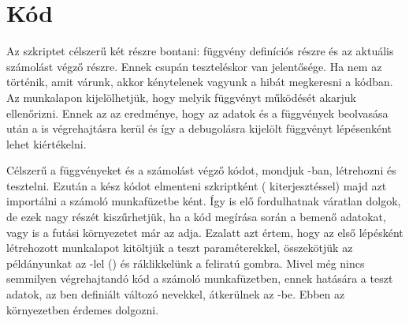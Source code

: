 \section{Kód}
\label{sec:2.2} %
Az  szkriptet célszerű két részre bontani: függvény definíciós
részre és az aktuális számolást 
végző részre. Ennek csupán teszteléskor van jelentősége. Ha nem az
történik, amit várunk, 
akkor kénytelenek vagyunk a hibát megkeresni a kódban. Az 
munkalapon kijelölhetjük, hogy melyik függvényt működését akarjuk
ellenőrizni. Ennek az az eredménye, hogy az 
adatok és a függvények beolvasása után a  is
végrehajtásra kerül és így 
a debugolásra kijelölt függvényt lépésenként lehet kiértékelni.

Célszerű a függvényeket és a számolást végző kódot, mondjuk -ban, létrehozni
és tesztelni. Ezután a kész kódot elmenteni  szkriptként (
kiterjesztéssel) majd azt importálni a számoló munkafüzetbe ként. Így is elő fordulhatnak váratlan dolgok, de 
ezek nagy részét kiszűrhetjük, ha a kód megírása során a bemenő
adatokat, vagy is a futási 
környezetet már az  adja. Ezalatt azt értem, hogy az első
lépésként létrehozott  
munkalapot kitöltjük a teszt paraméterekkel, összekötjük az 
példányunkat az -lel 
() és ráklikkelünk a
 feliratú gombra. Mivel még nincs semmilyen
végrehajtandó kód a számoló munkafüzetben, ennek hatására a teszt
adatok, az ben definiált változó nevekkel, átkerülnek az
-be. Ebben az  környezetben érdemes dolgozni.


